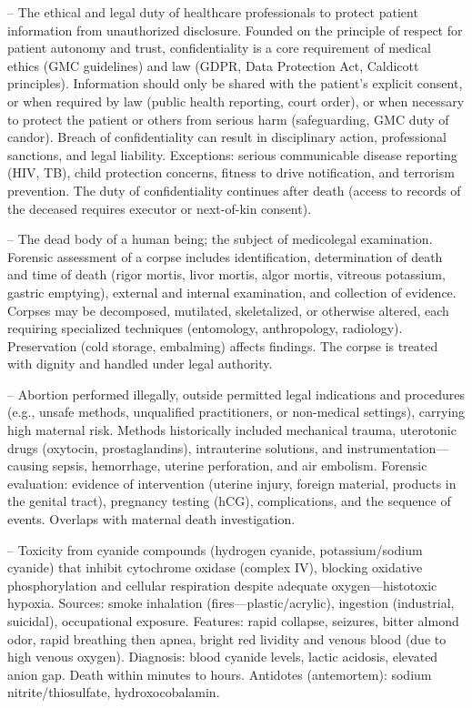 -- The ethical and legal duty of healthcare professionals to protect patient information from unauthorized disclosure. Founded on the principle of respect for patient autonomy and trust, confidentiality is a core requirement of medical ethics (GMC guidelines) and law (GDPR, Data Protection Act, Caldicott principles). Information should only be shared with the patient's explicit consent, or when required by law (public health reporting, court order), or when necessary to protect the patient or others from serious harm (safeguarding, GMC duty of candor). Breach of confidentiality can result in disciplinary action, professional sanctions, and legal liability. Exceptions: serious communicable disease reporting (HIV, TB), child protection concerns, fitness to drive notification, and terrorism prevention. The duty of confidentiality continues after death (access to records of the deceased requires executor or next-of-kin consent).

-- The dead body of a human being; the subject of medicolegal examination. Forensic assessment of a corpse includes identification, determination of death and time of death (rigor mortis, livor mortis, algor mortis, vitreous potassium, gastric emptying), external and internal examination, and collection of evidence. Corpses may be decomposed, mutilated, skeletalized, or otherwise altered, each requiring specialized techniques (entomology, anthropology, radiology). Preservation (cold storage, embalming) affects findings. The corpse is treated with dignity and handled under legal authority.

-- Abortion performed illegally, outside permitted legal indications and procedures (e.g., unsafe methods, unqualified practitioners, or non-medical settings), carrying high maternal risk. Methods historically included mechanical trauma, uterotonic drugs (oxytocin, prostaglandins), intrauterine solutions, and instrumentation—causing sepsis, hemorrhage, uterine perforation, and air embolism. Forensic evaluation: evidence of intervention (uterine injury, foreign material, products in the genital tract), pregnancy testing (hCG), complications, and the sequence of events. Overlaps with maternal death investigation.

-- Toxicity from cyanide compounds (hydrogen cyanide, potassium/sodium cyanide) that inhibit cytochrome oxidase (complex IV), blocking oxidative phosphorylation and cellular respiration despite adequate oxygen—histotoxic hypoxia. Sources: smoke inhalation (fires—plastic/acrylic), ingestion (industrial, suicidal), occupational exposure. Features: rapid collapse, seizures, bitter almond odor, rapid breathing then apnea, bright red lividity and venous blood (due to high venous oxygen). Diagnosis: blood cyanide levels, lactic acidosis, elevated anion gap. Death within minutes to hours. Antidotes (antemortem): sodium nitrite/thiosulfate, hydroxocobalamin.


